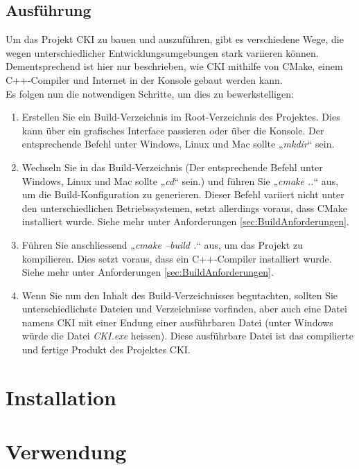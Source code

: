 \subsection{Ausführung}
\label{sec:BuildAusführung}
Um das Projekt CKI zu bauen und auszuführen, gibt es verschiedene Wege, die wegen unterschiedlicher Entwicklungsumgebungen stark variieren können. Dementsprechend ist hier nur beschrieben, wie CKI mithilfe von CMake, einem C++-Compiler und Internet in der Konsole gebaut werden kann.
\\
Es folgen nun die notwendigen Schritte, um dies zu bewerkstelligen:
\begin{enumerate}
	\item Erstellen Sie ein Build-Verzeichnis im Root-Verzeichnis des Projektes. Dies kann über ein grafisches Interface passieren oder über die Konsole. Der entsprechende Befehl unter Windows, Linux und Mac sollte „\textit{mkdir}“ sein.
	\item Wechseln Sie in das Build-Verzeichnis (Der entsprechende Befehl unter Windows, Linux und Mac sollte „\textit{cd}“ sein.) und führen Sie „\textit{cmake ..}“ aus, um die Build-Konfiguration zu generieren. Dieser Befehl variiert nicht unter den unterschiedlichen Betriebssystemen, setzt allerdings voraus, dass CMake installiert wurde. Siehe mehr unter Anforderungen \ref{sec:BuildAnforderungen}.
	\item Führen Sie anschliessend „\textit{cmake --build .}“ aus, um das Projekt zu kompilieren. Dies setzt voraus, dass ein C++-Compiler installiert wurde. Siehe mehr unter Anforderungen \ref{sec:BuildAnforderungen}.
	\item Wenn Sie nun den Inhalt des Build-Verzeichnisses begutachten, sollten Sie unterschiedlichste Dateien und Verzeichnisse vorfinden, aber auch eine Datei namens CKI mit einer Endung einer ausführbaren Datei (unter Windows würde die Datei \textit{CKI.exe} heissen). Diese ausführbare Datei ist das compilierte und fertige Produkt des Projektes CKI.
\end{enumerate}

\section{Installation}

\section{Verwendung}
